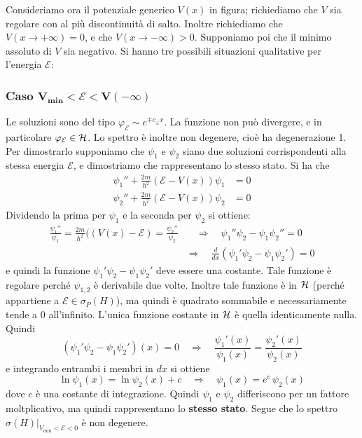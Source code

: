 \documentclass[../../FisicaTeorica.tex]{subfiles}
\begin{document}
Consideriamo ora il potenziale generico $V(x)$ in figura; richiediamo che $V$ sia regolare con al più discontinuità di salto. Inoltre richiediamo che $V(x\to + \infty)=0$, e che $V(x\to-\infty) > 0$. Supponiamo poi che il minimo assoluto di $V$ sia negativo. Si hanno tre possibili situazioni qualitative per l'energia $\mathcal E$:




\subsubsection{Caso $\bm{V_{\text{min}} < \mathcal E < V(- \infty)}$}
Le soluzioni sono del tipo $\varphi_\mathcal{E}\sim e^{\mp c_\pm x}$. La funzione non può divergere, e in particolare $\varphi_\mathcal{E}\in \mathcal{H}$. Lo spettro è inoltre non degenere, cioè ha degenerazione 1. Per dimostrarlo supponiamo che $\psi_1$ e $\psi_2$ siano due soluzioni corrispondenti alla stessa energia $\mathcal{E}$, e dimostriamo che rappresentano lo stesso stato. Si ha che
\begin{align*}
\psi_1'' + \frac{2m}{\hbar^2}(\mathcal{E}-V(x))\psi_1 &= 0\\[0.6em]
\psi_2'' + \frac{2m}{\hbar^2}(\mathcal{E}-V(x))\psi_2 &= 0
\end{align*}
Dividendo la prima per $\psi_1$ e la seconda per $\psi_2$ si ottiene:
\begin{align*}
\frac{\psi_1''}{\psi_1}=\frac{2m}{\hbar^2}((V(x)-\mathcal{E})=\frac{\psi_2''}{\psi_2} & \quad \Rightarrow \quad \psi_1''\psi_2 - \psi_1\psi_2'' = 0\\
& \Rightarrow \quad \frac{d}{dx}(\psi_1' \psi_2 - \psi_1 \psi_2') = 0
\end{align*}
e quindi la funzione $\psi_1'\psi_2 - \psi_1 \psi_2'$ deve essere una costante. Tale funzione è regolare perché $\psi_{1,2}$ è derivabile due volte. Inoltre tale funzione è in $\mathcal{H}$ (perché appartiene a $\mathcal{E}\in \sigma_P(H)$), ma quindi è quadrato sommabile e necessariamente tende a 0 all'infinito. L'unica funzione costante in $\mathcal{H}$ è quella identicamente nulla. Quindi
\[
(\psi_1' \psi_2 - \psi_1 \psi_2')(x) = 0 \quad \Rightarrow \quad \frac{\psi_1'(x)}{\psi_1(x)} = \frac{\psi_2'(x)}{\psi_2(x)}
\]
e integrando entrambi i membri in $dx$ si ottiene
\[
\ln \psi_1(x) = \ln \psi_2(x) + c \quad
\Rightarrow \quad \psi_1(x) = e^{c} \, \psi_2(x)
\]
dove $c$ è una costante di integrazione. Quindi $\psi_1$ e $\psi_2$ differiscono per un fattore moltplicativo, ma quindi rappresentano lo \textbf{stesso stato}.
Segue che lo spettro  $\sigma(H)|_{V_\text{min} < \mathcal{E} < 0}$ è non degenere.
\end{document}
